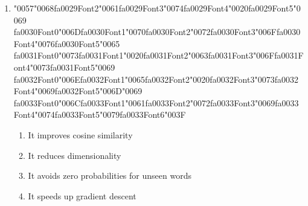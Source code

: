 \documentclass[12pt]{article}
\begin{document}
\begin{enumerate}[label=Q\arabic*.]
\begin{enumerate}[label=(\Alph*)]
\end{enumerate}
\item {\char"0057}{\char"0068}{\csname fa0029Font2\endcsname\char"0061}{\csname fa0029Font3\endcsname\char"0074}{\csname fa0029Font4\endcsname\char"0020}{\csname fa0029Font5\endcsname\char"0069} {\csname fa0030Font0\endcsname\char"006D}{\csname fa0030Font1\endcsname\char"0070}{\csname fa0030Font2\endcsname\char"0072}{\csname fa0030Font3\endcsname\char"006F}{\csname fa0030Font4\endcsname\char"0076}{\csname fa0030Font5\endcsname\char"0065} {\csname fa0031Font0\endcsname\char"0073}{\csname fa0031Font1\endcsname\char"0020}{\csname fa0031Font2\endcsname\char"0063}{\csname fa0031Font3\endcsname\char"006F}{\csname fa0031Font4\endcsname\char"0073}{\csname fa0031Font5\endcsname\char"0069} {\csname fa0032Font0\endcsname\char"006E}{\csname fa0032Font1\endcsname\char"0065}{\csname fa0032Font2\endcsname\char"0020}{\csname fa0032Font3\endcsname\char"0073}{\csname fa0032Font4\endcsname\char"0069}{\csname fa0032Font5\endcsname\char"006D}{\char"0069} {\csname fa0033Font0\endcsname\char"006C}{\csname fa0033Font1\endcsname\char"0061}{\csname fa0033Font2\endcsname\char"0072}{\csname fa0033Font3\endcsname\char"0069}{\csname fa0033Font4\endcsname\char"0074}{\csname fa0033Font5\endcsname\char"0079}{\csname fa0033Font6\endcsname\char"003F}
\begin{enumerate}[label=(\Alph*)]
    \item It improves cosine similarity
    \item It reduces dimensionality
    \item It avoids zero probabilities for unseen words
    \item It speeds up gradient descent
\end{enumerate}

\end{enumerate}
\end{document}
